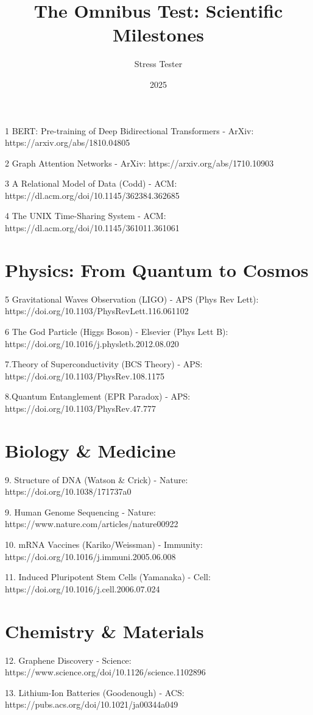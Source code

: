 \documentclass[12pt]{article}
\title{The Omnibus Test: Scientific Milestones}
\author{Stress Tester}
\date{2025}
\begin{document}
\maketitle

1 BERT: Pre-training of Deep Bidirectional Transformers - ArXiv:
https://arxiv.org/abs/1810.04805

2 Graph Attention Networks - ArXiv:
https://arxiv.org/abs/1710.10903

3 A Relational Model of Data (Codd) - ACM:
https://dl.acm.org/doi/10.1145/362384.362685

4 The UNIX Time-Sharing System - ACM:
https://dl.acm.org/doi/10.1145/361011.361061

\section{Physics: From Quantum to Cosmos}
5 Gravitational Waves Observation (LIGO) - APS (Phys Rev Lett):
https://doi.org/10.1103/PhysRevLett.116.061102

6 The God Particle (Higgs Boson) - Elsevier (Phys Lett B):
https://doi.org/10.1016/j.physletb.2012.08.020

7.Theory of Superconductivity (BCS Theory) - APS:
https://doi.org/10.1103/PhysRev.108.1175

8.Quantum Entanglement (EPR Paradox) - APS:
https://doi.org/10.1103/PhysRev.47.777

\section{Biology \& Medicine}
9. Structure of DNA (Watson & Crick) - Nature:
https://doi.org/10.1038/171737a0

9. Human Genome Sequencing - Nature:
https://www.nature.com/articles/nature00922

10. mRNA Vaccines (Kariko/Weissman) - Immunity:
https://doi.org/10.1016/j.immuni.2005.06.008

11. Induced Pluripotent Stem Cells (Yamanaka) - Cell:
https://doi.org/10.1016/j.cell.2006.07.024

\section{Chemistry \& Materials}
12. Graphene Discovery - Science:
https://www.science.org/doi/10.1126/science.1102896

13. Lithium-Ion Batteries (Goodenough) - ACS:
https://pubs.acs.org/doi/10.1021/ja00344a049
\end{document}
